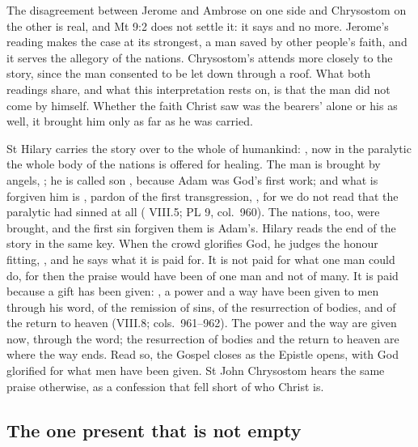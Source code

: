 The disagreement between Jerome and Ambrose on one side and Chrysostom on the
other is real, and Mt 9:2 does not settle it: it says 
and no more. Jerome's reading makes the case at its strongest, a man saved by other people's faith, and it serves
the allegory of the nations. Chrysostom's attends more closely to the story,
since the man consented to be let down through a roof. What both readings
share, and what this interpretation rests on, is that the man did not come by
himself. Whether the faith Christ saw was the bearers' alone or his as well, it
brought him only as far as he was carried.

St Hilary carries the story over to the whole of humankind: , now in the paralytic the
whole body of the nations is offered for healing. The man is brought by
angels, ; he is called son
, because Adam was God's first work; and what
is forgiven him is , pardon of the
first transgression, ,
for we do not read that the paralytic had sinned at all ( VIII.5; PL 9, col.~960). The nations, too, were brought, and the
first sin forgiven them is Adam's. Hilary reads the end of the story in the
same key. When the crowd glorifies God, he judges the honour fitting,
, and he says what it is paid for. It is
not paid for what one man could do, for then the praise would have been of one
man and not of many. It is paid because a gift has been given:
, a power and
a way have been given to men through his word, of the remission of sins, of the
resurrection of bodies, and of the return to heaven (VIII.8;
cols.~961--962). The power and the way are given now, through the word; the
resurrection of bodies and the return to heaven are where the way ends. Read
so, the Gospel closes as the Epistle opens, with God glorified for what men
have been given. St John Chrysostom hears the same praise otherwise, as a
confession that fell short of who Christ is.

\subsection{The one present that is not empty}

